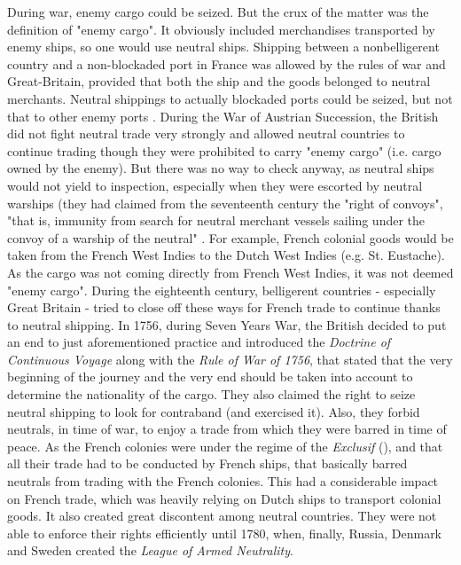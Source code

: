\documentclass[12pt,a4paper,notitlepage,english]{article}
\begin{document}
During war, enemy cargo could be seized. But the crux of the matter was the definition of "enemy cargo". It obviously included merchandises transported by enemy ships, so one would use neutral ships.
Shipping between a nonbelligerent country and a non-blockaded port in France was allowed by the rules of war and Great-Britain, provided that both the ship and the goods belonged to neutral merchants.
Neutral shippings to actually blockaded ports could be seized, but not that to other enemy ports \citep[p. 112]{Schnakenbourg2013}.
During the War of Austrian Succession, the British did not fight neutral trade very strongly and allowed neutral countries to continue trading though they were prohibited to carry "enemy cargo" (i.e. cargo owned by the enemy). But there was no way to check anyway, as neutral ships would not yield to inspection, especially when they were escorted by neutral warships (they had claimed from the seventeenth century the "right of convoys", "that is, immunity from search for neutral merchant vessels sailing under the convoy of a warship of the neutral"  \citep{TheEditorsofEncyclopaediaBritannica2014} .
For example, French colonial goods would be taken from the French West Indies to the Dutch West Indies (e.g. St. Eustache).
As the cargo was not coming directly from French West Indies, it was not deemed "enemy cargo". 
During the eighteenth century, belligerent countries - especially Great Britain - tried to  close off these ways for French trade to continue thanks to neutral shipping.
In 1756, during Seven Years War, the British decided to put an end to just aforementioned practice and introduced the \textit{Doctrine of Continuous Voyage} along with the \textit{Rule of War of 1756}, that stated that the very beginning of the journey and the very end should be taken into account to determine the nationality of the cargo.
They also claimed the right to seize neutral shipping to look for contraband (and exercised it).
Also, they forbid neutrals, in time of war, to enjoy a trade from which they were barred in time of peace. As the French colonies were under the regime of the \textit{Exclusif} (\cite{Tarrade1972}), and that all their trade had to be conducted by French ships, that basically barred neutrals from trading with the French colonies.
This had a considerable impact on French trade, which was heavily relying on Dutch ships to transport colonial goods.
It also created great discontent among neutral countries. They were not able to enforce their rights efficiently until 1780, when, finally, Russia, Denmark and Sweden created the \textit{League of Armed Neutrality}.
\end{document}
